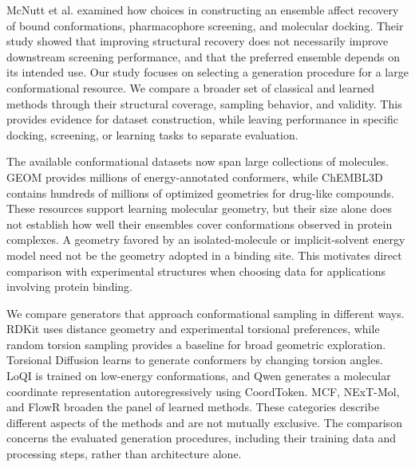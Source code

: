 McNutt et al.\cite{mcnutt2023conformers} examined how choices in constructing an ensemble affect recovery of bound
conformations, pharmacophore screening, and molecular docking. Their study showed that improving
structural recovery does not necessarily improve downstream screening performance, and that the
preferred ensemble depends on its intended use. Our study focuses on selecting a generation
procedure for a large conformational resource. We compare a broader set of classical and learned
methods through their structural coverage, sampling behavior, and validity. This provides evidence
for dataset construction, while leaving performance in specific docking, screening, or learning
tasks to separate evaluation.

The available conformational datasets now span large collections of molecules. GEOM\cite{axelrod2022geom} provides
millions of energy-annotated conformers, while ChEMBL3D\cite{nikitin2025loqi} contains hundreds of millions of optimized
geometries for drug-like compounds. These resources support learning molecular geometry, but their
size alone does not establish how well their ensembles cover conformations observed in protein
complexes. A geometry favored by an isolated-molecule or implicit-solvent energy model need not be
the geometry adopted in a binding site.\cite{friedrich2018diversity} This motivates direct comparison with experimental
structures when choosing data for applications involving protein
binding.

We compare generators that approach conformational sampling in different ways. RDKit\cite{wang2020etkdg} uses distance
geometry and experimental torsional preferences, while random torsion sampling provides a baseline
for broad geometric exploration. Torsional Diffusion\cite{jing2022torsional} learns to generate conformers by changing
torsion angles. LoQI\cite{nikitin2025loqi} is trained on low-energy conformations, and Qwen generates a molecular
coordinate representation autoregressively using CoordToken.\cite{geikyan2026coordtoken} MCF,\cite{wang2024mcf} NExT-Mol,\cite{liu2025nextmol} and FlowR\cite{cremer2025flowr} broaden the panel of learned
methods. These categories describe different aspects of the methods and are not mutually exclusive.
The comparison concerns the evaluated generation procedures, including their training data and
processing steps, rather than architecture
alone.


